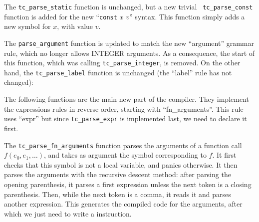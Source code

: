 The {\tt tc\_parse\_static} function is unchanged, but a new trivial {\tt
  tc\_parse\_const} function is added for the new ``{\tt const} $x$ $v$''
syntax. This function simply adds a new symbol for $x$, with value $v$.


The {\tt parse\_argument} function is updated to match the new ``argument''
grammar rule, which no longer allows INTEGER arguments. As a consequence, the
start of this function, which was calling {\tt tc\_parse\_integer}, is removed.
On the other hand, the {\tt tc\_parse\_label} function is unchanged (the
``label'' rule has not changed):


The following functions are the main new part of the compiler. They implement
the expressions rules in reverse order, starting with ``fn\_arguments''. This
rule uses ``expr'' but since {\tt tc\_parse\_expr} is implemented last, we need
to declare it first.


The {\tt tc\_parse\_fn\_arguments} function parses the arguments of a function
call $f(e_0,e_1,\ldots)$, and takes as argument the symbol corresponding to
$f$. It first checks that this symbol is not a local variable, and panics
otherwise. It then parses the arguments with the recursive descent method:
after parsing the opening parenthesis, it parses a first expression unless the
next token is a closing parenthesis. Then, while the next token is a comma, it
reads it and parses another expression. This generates the compiled code for
the arguments, after which we just need to write a  instruction.

